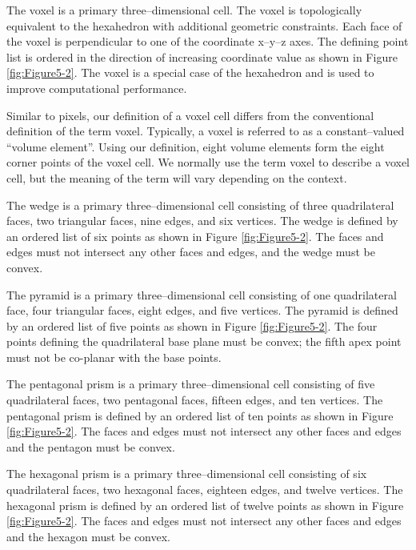 \begin{description}[leftmargin=0cm,labelindent=0cm]
\item[Voxel.\index{cell!voxel}] The voxel is a primary three--dimensional cell. The voxel is topologically equivalent to the hexahedron with additional geometric constraints. Each face of the voxel is perpendicular to one of the coordinate x--y--z axes. The defining point list is ordered in the direction of increasing coordinate value as shown in Figure \ref{fig:Figure5-2}. The voxel is a special case of the hexahedron and is used to improve computational performance.

Similar to pixels, our definition of a voxel cell differs from the conventional definition of the term voxel. Typically, a voxel is referred to as a constant--valued ``volume element''. Using our definition, eight volume elements form the eight corner points of the voxel cell. We normally use the term voxel to describe a voxel cell, but the meaning of the term will vary depending on the context.

\item[Wedge.\index{cell!wedge}] The wedge is a primary three--dimensional cell consisting of three quadrilateral faces, two triangular faces, nine edges, and six vertices. The wedge is defined by an ordered list of six points as shown in Figure \ref{fig:Figure5-2}. The faces and edges must not intersect any other faces and edges, and the wedge must be convex.

\item[Pyramid.\index{cell!pyramid}\index{pyramid}] The pyramid is a primary three--dimensional cell consisting of one quadrilateral face, four triangular faces, eight edges, and five vertices. The pyramid is defined by an ordered list of five points as shown in Figure \ref{fig:Figure5-2}. The four points defining the quadrilateral base plane must be convex; the fifth apex point must not be co-planar with the base points.

\item[Pentagonal Prism.] The pentagonal prism is a primary three--dimensional cell consisting of five quadrilateral faces, two pentagonal faces, fifteen edges, and ten vertices. The pentagonal prism is defined by an ordered list of ten points as shown in Figure \ref{fig:Figure5-2}. The faces and edges must not intersect any other faces and edges and the pentagon must be convex.

\item[Hexagonal Prism.] The hexagonal prism is a primary three--dimensional cell consisting of six quadrilateral faces, two hexagonal faces, eighteen edges, and twelve vertices. The hexagonal prism is defined by an ordered list of twelve points as shown in Figure \ref{fig:Figure5-2}. The faces and edges must not intersect any other faces and edges and the hexagon must be convex.

\end{description}

